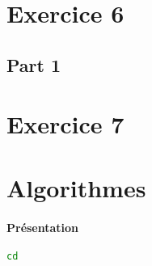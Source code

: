 \documentclass{article}
\begin{document}
\section{Exercice 6}
\subsection{Part 1}


\section{Exercice 7}



\section{Algorithmes}
\paragraph{Présentation}

\begin{scriptsize}\mycode
    \begin{lstlisting}[language=Bash]
    cd
    \end{lstlisting}
\end{scriptsize}
\end{document}
